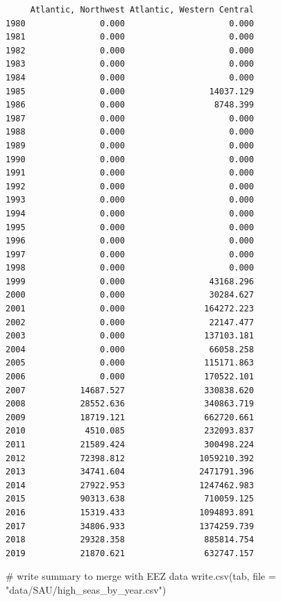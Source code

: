 \documentclass[
  letterpaper,
  oneside,
  open=any]{scrbook}
\newenvironment{Shaded}{\begin{snugshade}}{\end{snugshade}}
\newcommand{\AttributeTok}[1]{\textcolor[rgb]{0.40,0.45,0.13}{#1}}
\newcommand{\CommentTok}[1]{\textcolor[rgb]{0.37,0.37,0.37}{#1}}
\newcommand{\FunctionTok}[1]{\textcolor[rgb]{0.28,0.35,0.67}{#1}}
\newcommand{\NormalTok}[1]{\textcolor[rgb]{0.00,0.23,0.31}{#1}}
\newcommand{\StringTok}[1]{\textcolor[rgb]{0.13,0.47,0.30}{#1}}
\begin{document}
\begin{verbatim}
     Atlantic, Northwest Atlantic, Western Central
1980               0.000                     0.000
1981               0.000                     0.000
1982               0.000                     0.000
1983               0.000                     0.000
1984               0.000                     0.000
1985               0.000                 14037.129
1986               0.000                  8748.399
1987               0.000                     0.000
1988               0.000                     0.000
1989               0.000                     0.000
1990               0.000                     0.000
1991               0.000                     0.000
1992               0.000                     0.000
1993               0.000                     0.000
1994               0.000                     0.000
1995               0.000                     0.000
1996               0.000                     0.000
1997               0.000                     0.000
1998               0.000                     0.000
1999               0.000                 43168.296
2000               0.000                 30284.627
2001               0.000                164272.223
2002               0.000                 22147.477
2003               0.000                137103.181
2004               0.000                 66058.258
2005               0.000                115171.863
2006               0.000                170522.101
2007           14687.527                330838.620
2008           28552.636                340863.719
2009           18719.121                662720.661
2010            4510.085                232093.837
2011           21589.424                300498.224
2012           72398.812               1059210.392
2013           34741.604               2471791.396
2014           27922.953               1247462.983
2015           90313.638                710059.125
2016           15319.433               1094893.891
2017           34806.933               1374259.739
2018           29328.358                885814.754
2019           21870.621                632747.157
\end{verbatim}

\begin{Shaded}
\begin{Highlighting}[]
\CommentTok{\# write summary to merge with EEZ data }
\FunctionTok{write.csv}\NormalTok{(tab, }\AttributeTok{file =} \StringTok{"data/SAU/high\_seas\_by\_year.csv"}\NormalTok{)}
\end{Highlighting}
\end{Shaded}
\end{document}
